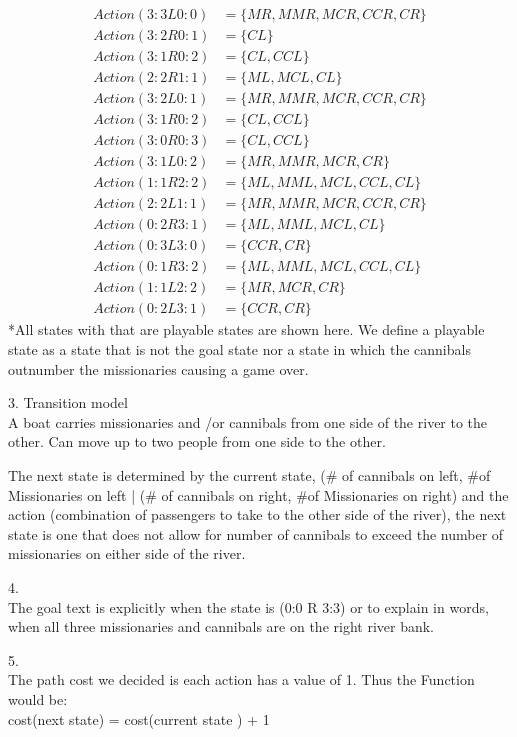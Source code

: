 \documentclass{article}
\begin{document}
\begin{align*}
	Action(3:3 L 0:0) &= \{ MR, MMR, MCR, CCR, CR \} \\
	Action(3:2 R 0:1) &=  \{ CL \}\\
	Action(3:1 R 0:2) &= \{ CL, CCL \}\\
	Action(2:2 R 1:1) &= \{ ML, MCL, CL\}\\
	Action(3:2 L 0:1) &= \{ MR,MMR,MCR,CCR,CR\}\\
	Action(3:1 R 0:2) &= \{ CL, CCL\}\\
	Action(3:0 R 0:3) &= \{ CL, CCL\} \\
	Action(3:1 L 0:2) &= \{  MR, MMR, MCR,CR\}\\
	Action(1:1 R 2:2) &= \{ ML, MML, MCL, CCL, CL\} \\
	Action(2:2 L 1:1) &= \{ MR, MMR, MCR, CCR, CR\} \\
	Action(0:2 R 3:1) &= \{ ML, MML, MCL, CL\} \\
	Action(0:3 L 3:0) &= \{ CCR, CR\} \\
	Action(0:1 R 3:2) &= \{ ML, MML, MCL, CCL, CL\} \\
	Action(1:1 L 2:2) &= \{ MR, MCR, CR\} \\
	Action(0:2 L 3:1) &= \{ CCR, CR\}
\end{align*}	
	*All states with that are playable states are shown here. We define a playable state as a state that is not the goal state nor a state in which the cannibals outnumber the missionaries causing a game over. 


3. Transition model\\
A boat carries missionaries and /or  cannibals from one side of the river to the other. Can move up to two people from one side to the other.

The next state is determined by the current state, (\# of cannibals on left, \#of Missionaries on left | (\# of cannibals on right, \#of Missionaries on right) and the action (combination of passengers to take to the other side of the river), the next state is one that does not allow for number of cannibals to exceed the number of missionaries on either side of the river.



4.\\
 The goal text is explicitly when the state is (0:0 R 3:3) or to explain in words, when all three missionaries and cannibals are on the right river bank.

5. \\
The path cost we decided is each action has a value of 1. Thus the Function would be:  \\ 
cost(next state) = cost(current state ) + 1 
\end{document}
